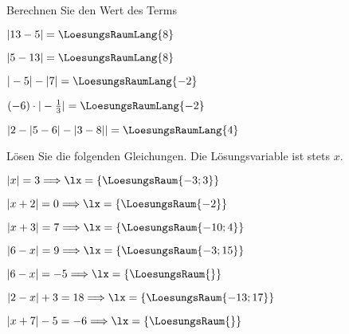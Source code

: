 
\renewcommand{\bbwAufgabenBlockID}{A1Be}

\renewcommand{\metaHeaderLine}{Aufgabenblatt}
\renewcommand{\arbeitsblattTitel}{Algebra: Betrag}



\arbeitsblattHeader{}
Berechnen Sie den Wert des Terms

\begin{bbwAufgabenBlock}
\item $|13-5| = \LoesungsRaumLang{8}$
\item $|5-13| = \LoesungsRaumLang{8}$
\item $|-5| - |7| = \LoesungsRaumLang{-2}$
\item $(-6)\cdot{}|-\frac{1}{3}| = \LoesungsRaumLang{-2}$
\item $|2 - |5-6| - |3-8|| = \LoesungsRaumLang{4}$
\end{bbwAufgabenBlock}

\platzFuerBerechnungenBisEndeSeite{}



Lösen Sie die folgenden Gleichungen. Die Lösungsvariable ist stets $x$.

\begin{bbwAufgabenBlock}
\item $|x|=3 \Longrightarrow \lx=\{ \LoesungsRaum{-3; 3\}}$
\item $|x+2|=0 \Longrightarrow \lx=\{ \LoesungsRaum{-2\}}$
\item $|x+3|=7 \Longrightarrow \lx=\{ \LoesungsRaum{-10;4\}}$
\item $|6-x|=9 \Longrightarrow \lx=\{ \LoesungsRaum{-3;15\}}$
\item $|6-x|=-5 \Longrightarrow \lx=\{ \LoesungsRaum{\}}$
\item $|2-x|+3=18 \Longrightarrow \lx=\{ \LoesungsRaum{-13;17\}}$
\item $|x+7|-5=-6 \Longrightarrow \lx=\{ \LoesungsRaum{\}}$
\end{bbwAufgabenBlock}


\platzFuerBerechnungenBisEndeSeite{}

\platzFuerBerechnungenBisEndeSeite{}


